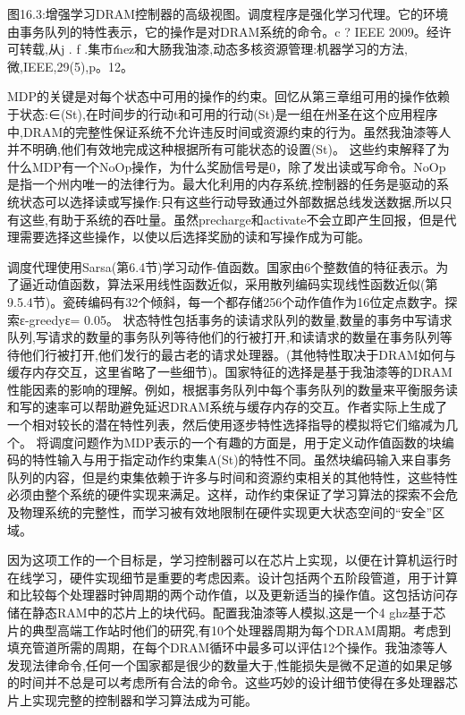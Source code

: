 图16.3:增强学习DRAM控制器的高级视图。调度程序是强化学习代理。它的环境由事务队列的特性表示，它的操作是对DRAM系统的命令。c ? IEEE 2009。经许可转载,从j . f .集市́ınez和大肠我̇油漆,动态多核资源管理:机器学习的方法,微,IEEE,29(5),p。12。

MDP的关键是对每个状态中可用的操作的约束。回忆从第三章组可用的操作依赖于状态:∈(St),在时间步的行动t和可用的行动(St)是一组在州圣在这个应用程序中,DRAM的完整性保证系统不允许违反时间或资源约束的行为。虽然我̇油漆等人并不明确,他们有效地完成这种根据所有可能状态的设置(St)。
这些约束解释了为什么MDP有一个NoOp操作，为什么奖励信号是0，除了发出读或写命令。NoOp是指一个州内唯一的法律行为。最大化利用的内存系统,控制器的任务是驱动的系统状态可以选择读或写操作:只有这些行动导致通过外部数据总线发送数据,所以只有这些,有助于系统的吞吐量。虽然precharge和activate不会立即产生回报，但是代理需要选择这些操作，以使以后选择奖励的读和写操作成为可能。

调度代理使用Sarsa(第6.4节)学习动作-值函数。国家由6个整数值的特征表示。为了逼近动值函数，算法采用线性函数近似，采用散列编码实现线性函数近似(第9.5.4节)。瓷砖编码有32个倾斜，每一个都存储256个动作值作为16位定点数字。探索ε-greedyε= 0.05。
状态特性包括事务的读请求队列的数量,数量的事务中写请求队列,写请求的数量的事务队列等待他们的行被打开,和读请求的数量在事务队列等待他们行被打开,他们发行的最古老的请求处理器。(其他特性取决于DRAM如何与缓存内存交互，这里省略了一些细节)。国家特征的选择是基于我̇油漆等的DRAM性能因素的影响的理解。例如，根据事务队列中每个事务队列的数量来平衡服务读和写的速率可以帮助避免延迟DRAM系统与缓存内存的交互。作者实际上生成了一个相对较长的潜在特性列表，然后使用逐步特性选择指导的模拟将它们缩减为几个。
将调度问题作为MDP表示的一个有趣的方面是，用于定义动作值函数的块编码的特性输入与用于指定动作约束集A(St)的特性不同。虽然块编码输入来自事务队列的内容，但是约束集依赖于许多与时间和资源约束相关的其他特性，这些特性必须由整个系统的硬件实现来满足。这样，动作约束保证了学习算法的探索不会危及物理系统的完整性，而学习被有效地限制在硬件实现更大状态空间的“安全”区域。

因为这项工作的一个目标是，学习控制器可以在芯片上实现，以便在计算机运行时在线学习，硬件实现细节是重要的考虑因素。设计包括两个五阶段管道，用于计算和比较每个处理器时钟周期的两个动作值，以及更新适当的操作值。这包括访问存储在静态RAM中的芯片上的块代码。配置我̇油漆等人模拟,这是一个4 ghz基于芯片的典型高端工作站时他们的研究,有10个处理器周期为每个DRAM周期。考虑到填充管道所需的周期，在每个DRAM循环中最多可以评估12个操作。我̇油漆等人发现法律命令,任何一个国家都是很少的数量大于,性能损失是微不足道的如果足够的时间并不总是可以考虑所有合法的命令。这些巧妙的设计细节使得在多处理器芯片上实现完整的控制器和学习算法成为可能。

